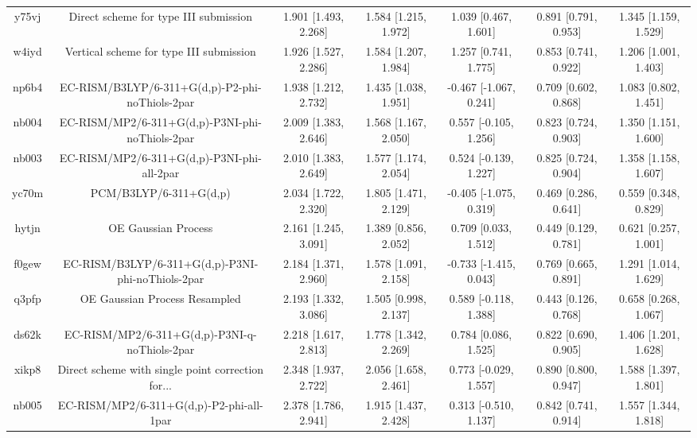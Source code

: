 \documentclass{article}
\begin{document}
\begin{center}
\begin{longtable}{|ccccccc|}
 y75vj &              Direct scheme for type III submission &  1.901 [1.493, 2.268] &  1.584 [1.215, 1.972] &     1.039 [0.467, 1.601] &  0.891 [0.791, 0.953] &   1.345 [1.159, 1.529] \\
 w4iyd &            Vertical scheme for type III submission &  1.926 [1.527, 2.286] &  1.584 [1.207, 1.984] &     1.257 [0.741, 1.775] &  0.853 [0.741, 0.922] &   1.206 [1.001, 1.403] \\
 np6b4 &    EC-RISM/B3LYP/6-311+G(d,p)-P2-phi-noThiols-2par &  1.938 [1.212, 2.732] &  1.435 [1.038, 1.951] &   -0.467 [-1.067, 0.241] &  0.709 [0.602, 0.868] &   1.083 [0.802, 1.451] \\
 nb004 &    EC-RISM/MP2/6-311+G(d,p)-P3NI-phi-noThiols-2par &  2.009 [1.383, 2.646] &  1.568 [1.167, 2.050] &    0.557 [-0.105, 1.256] &  0.823 [0.724, 0.903] &   1.350 [1.151, 1.600] \\
 nb003 &         EC-RISM/MP2/6-311+G(d,p)-P3NI-phi-all-2par &  2.010 [1.383, 2.649] &  1.577 [1.174, 2.054] &    0.524 [-0.139, 1.227] &  0.825 [0.724, 0.904] &   1.358 [1.158, 1.607] \\
 yc70m &                             PCM/B3LYP/6-311+G(d,p) &  2.034 [1.722, 2.320] &  1.805 [1.471, 2.129] &   -0.405 [-1.075, 0.319] &  0.469 [0.286, 0.641] &   0.559 [0.348, 0.829] \\
 hytjn &                                OE Gaussian Process &  2.161 [1.245, 3.091] &  1.389 [0.856, 2.052] &     0.709 [0.033, 1.512] &  0.449 [0.129, 0.781] &   0.621 [0.257, 1.001] \\
 f0gew &  EC-RISM/B3LYP/6-311+G(d,p)-P3NI-phi-noThiols-2par &  2.184 [1.371, 2.960] &  1.578 [1.091, 2.158] &   -0.733 [-1.415, 0.043] &  0.769 [0.665, 0.891] &   1.291 [1.014, 1.629] \\
 q3pfp &                      OE Gaussian Process Resampled &  2.193 [1.332, 3.086] &  1.505 [0.998, 2.137] &    0.589 [-0.118, 1.388] &  0.443 [0.126, 0.768] &   0.658 [0.268, 1.067] \\
 ds62k &      EC-RISM/MP2/6-311+G(d,p)-P3NI-q-noThiols-2par &  2.218 [1.617, 2.813] &  1.778 [1.342, 2.269] &     0.784 [0.086, 1.525] &  0.822 [0.690, 0.905] &   1.406 [1.201, 1.628] \\
 xikp8 &  Direct scheme with single point correction for... &  2.348 [1.937, 2.722] &  2.056 [1.658, 2.461] &    0.773 [-0.029, 1.557] &  0.890 [0.800, 0.947] &   1.588 [1.397, 1.801] \\
 nb005 &           EC-RISM/MP2/6-311+G(d,p)-P2-phi-all-1par &  2.378 [1.786, 2.941] &  1.915 [1.437, 2.428] &    0.313 [-0.510, 1.137] &  0.842 [0.741, 0.914] &   1.557 [1.344, 1.818] \\

\end{longtable}
\end{center}
\end{document}
